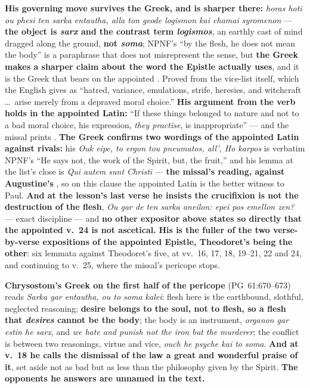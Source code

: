 \begin{witnessnote}
 \textbf{His
governing move survives the Greek, and is sharper there:} \emph{horas hoti ou
phesi ten sarka entautha, alla ton geode logismon kai chamai syromenon} ---
\textbf{the object is \emph{sarx} and the contrast term \emph{logismos}}, an
earthly cast of mind dragged along the ground, \textbf{not \emph{soma}}; NPNF's
``by the flesh, he does not mean the body'' is a paraphrase that does not
misrepresent the sense, but \textbf{the Greek makes a sharper claim about the
word the Epistle actually uses}, and it is the Greek that bears on the appointed
. Proved from the vice-list itself, which the
 English gives as ``hatred, variance,
emulations, strife, heresies, and witchcraft \dots\ arise merely from a
depraved moral choice.'' \textbf{His argument from the verb holds
in the appointed Latin:} ``If these things belonged to nature and not to a bad
moral choice, his expression, \emph{they practise}, is inappropriate'' --- and
the missal prints . \textbf{The Greek confirms two
wordings of the appointed Latin against rivals:} his \emph{Ouk eipe, to ergon
tou pneumatos, all', Ho karpos} is verbatim NPNF's ``He says not, the work of
the Spirit, but, the fruit,'' and his lemma at the list's close is \emph{Qui
autem sunt Christi} --- \textbf{the missal's reading, against Augustine's
}, so on this clause the appointed Latin is the
better witness to Paul. \textbf{And at the lesson's last verse he insists the
crucifixion is not the destruction of the flesh}, \emph{Ou gar de ten sarka
aneilon: epei pos emellon zen?} --- exact discipline --- and \textbf{no other
expositor above states so directly that the appointed v.~24 is not ascetical.}
\textbf{His is the fuller of the two verse-by-verse expositions of the
appointed Epistle, Theodoret's being the other}: six lemmata against
Theodoret's five, at vv.~16, 17, 18, 19--21, 22 and 24, and
continuing to v.~25, where the missal's pericope stops.
\end{witnessnote}

\textbf{Chrysostom's Greek on the first half of the pericope} (PG~61:670--673)
reads \emph{Sarka gar entautha, ou to soma kalei}: flesh here is the earthbound, slothful, neglected reasoning;
\textbf{desire belongs to the soul, not to flesh, so a flesh that
\emph{desires} cannot be the body}; the body is an instrument, \emph{organon
gar estin he sarx}, and \emph{we hate and punish not the iron but the murderer};
the conflict is between two reasonings, virtue and vice, \emph{ouch he psyche
kai to soma}. \textbf{And at v.~18 he calls the dismissal of the law a great and
wonderful praise of it}, set aside not as bad but as less than the philosophy
given by the Spirit. \textbf{The opponents he answers are unnamed in the text.}

